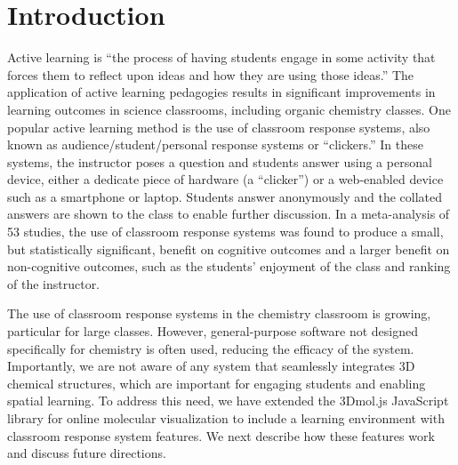 \documentclass[journal=jceda8,manuscript=article]{achemso}
\begin{document}
\section{Introduction}
Active learning is ``the process of having students engage in some activity that forces them to reflect upon ideas and how they are using those ideas.''\cite{collins2011greenwood}  The application of active learning pedagogies results in significant improvements in learning outcomes in science classrooms\cite{michael2006s,deslauriers2011improved,armbruster2009active}, including organic chemistry classes\cite{jeske2019collaborative,decicco2019clickers,webbased}.  One popular active learning method is the use of classroom response systems\cite{martyn2007clickers}, also known as audience/student/personal response systems or ``clickers.''  In these systems, the instructor poses a question and students answer using a personal device, either a dedicate piece of hardware (a ``clicker'') or a web-enabled device such as a smartphone or laptop\cite{webbased}.  Students answer anonymously and the collated answers are shown to the class to enable further discussion.  In a meta-analysis\cite{hunsu2016meta} of 53 studies, the use of classroom response systems was found to produce a small, but statistically significant, benefit on cognitive outcomes and a larger benefit on non-cognitive outcomes, such as the students' enjoyment of the class and ranking of the instructor.

The use of classroom response systems in the chemistry classroom is growing, particular for large classes\cite{gibbons2017chasm,woelk2008optimizing}.  However, general-purpose software not designed specifically for chemistry is often used, reducing the efficacy of the system\cite{webbased}.  Importantly, we are not aware of any system that seamlessly integrates 3D chemical structures, which are important for engaging students and enabling spatial learning\cite{viz32class}.  To address this need, we have extended the 3Dmol.js\cite{rego20153dmol} JavaScript library for online molecular visualization to include a learning environment with classroom response system features.  We next describe how these features work and discuss future directions.
\end{document}
